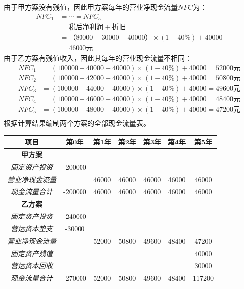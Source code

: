 \documentclass[
  10pt,
  twoside,
  openany,
  b5paper, %
  colorscheme = black, %
  xits = false,
]{qyxf-book}
\begin{document}
\begin{note}
	由于甲方案没有残值，因此甲方案每年的营业净现金流量$NFC$为：
	\begin{equation*}
		\begin{aligned}
			NFC_1 &= \cdots = NFC_5 \\
			&= \text{税后净利润} + {折旧} \\
			&= （80000-30000-40000）\times (1-40\%) + 40000 \\
			&= 46000 \text{元}
		\end{aligned}
	\end{equation*}
	由于乙方案有残值收入，因此其每年的营业现金流量不相同：
	\begin{equation*}
		\begin{aligned}
			NFC_1 &= (100000-40000-40000) \times (1-40\%) + 40000 = 52000\text{元} \\
			NFC_2 &= (100000-42000-40000) \times (1-40\%) +40000 =50800 \text{元} \\
			NFC_3 &= (100000-44000-40000) \times (1-40\%) +40000 =49600 \text{元} \\
			NFC_4 &= (100000-46000-40000) \times (1-40\%) +40000 =48400 \text{元} \\
			NFC_5 &= (100000-48000-40000) \times (1-40\%) +40000 =47200 \text{元} \\
		\end{aligned}
	\end{equation*}
	根据计算结果编制两个方案的全部现金流量表。
	\begin{center}
		\begin{tabular}{ccccccc}
			\toprule
			项目 & 第0年 & 第1年 & 第2年 & 第3年 & 第4年 & 第5年 \\
			\midrule
			\textbf{甲方案} &  & & & & & \\
			\emph{固定资产投资} & -200000 & & & & & \\
			\emph{营业净现金流量} & & 46000 & 46000 & 46000 & 46000 & 46000\\
			\emph{现金流量合计} & -200000 & 46000 & 46000 & 46000 & 46000 & 46000\\
			\textbf{乙方案}  & & & & & & \\ 
			\emph{固定资产投资} & -240000 & & & & & \\
			\emph{营运资本垫支} & -30000 & & & & & \\
			\emph{营业净现金流量} & & 52000 & 50800 & 49600 & 48400 & 47200\\
			\emph{固定资产残值} &  & & & & & 40000 \\
			\emph{营运资本回收} & & & & & & 30000 \\
			\emph{现金流量合计} & -270000 & 52000 & 50800 & 49600 & 48400 & 117200\\
			\bottomrule
		\end{tabular}
	\end{center}

\end{note}
\end{document}
